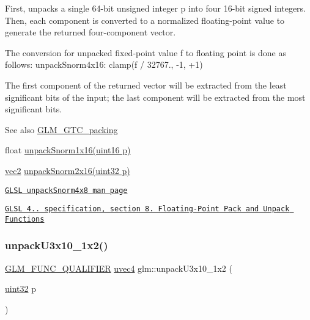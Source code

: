 First, unpacks a single 64-\/bit unsigned integer p into four 16-\/bit signed integers. Then, each component is converted to a normalized floating-\/point value to generate the returned four-\/component vector.

The conversion for unpacked fixed-\/point value f to floating point is done as follows\+: unpack\+Snorm4x16\+: clamp(f / 32767., -\/1, +1)

The first component of the returned vector will be extracted from the least significant bits of the input; the last component will be extracted from the most significant bits.

\begin{DoxySeeAlso}{See also}
\hyperlink{group__gtc__packing}{G\+L\+M\+\_\+\+G\+T\+C\+\_\+packing} 

float \hyperlink{group__gtc__packing_ga246f451cebf590726324f7a283e3d65e}{unpack\+Snorm1x16(uint16 p)} 

\hyperlink{group__core__types_gaa1618f51db67eaa145db101d8c8431d8}{vec2} \hyperlink{group__core__func__packing_gacd8f8971a3fe28418be0d0fa1f786b38}{unpack\+Snorm2x16(uint32 p)} 

\href{http://www.opengl.org/sdk/docs/manglsl/xhtml/unpackSnorm2x16.xml}{\tt G\+L\+SL unpack\+Snorm4x8 man page} 

\href{http://www.opengl.org/registry/doc/GLSLangSpec.4.20.8.pdf}{\tt G\+L\+SL 4.. specification, section 8. Floating-\/\+Point Pack and Unpack Functions} 
\end{DoxySeeAlso}
\mbox{\label{group__gtc__packing_ga119aa2d7d55952f9dc4214390a6ffefc}} 
\subsubsection{\texorpdfstring{unpack\+U3x10\+\_\+1x2()}{unpackU3x10\_1x2()}}
{\footnotesize\ttfamily \hyperlink{setup_8hpp_a33fdea6f91c5f834105f7415e2a64407}{G\+L\+M\+\_\+\+F\+U\+N\+C\+\_\+\+Q\+U\+A\+L\+I\+F\+I\+ER} \hyperlink{group__core__types_ga1c426d19627b32b14f0089f7f4ba7b1d}{uvec4} glm\+::unpack\+U3x10\+\_\+1x2 (\begin{DoxyParamCaption}\item[{\hyperlink{group__gtc__type__precision_ga202b6a53c105fcb7e531f9b443518451}{uint32}}]{p }\end{DoxyParamCaption})}

